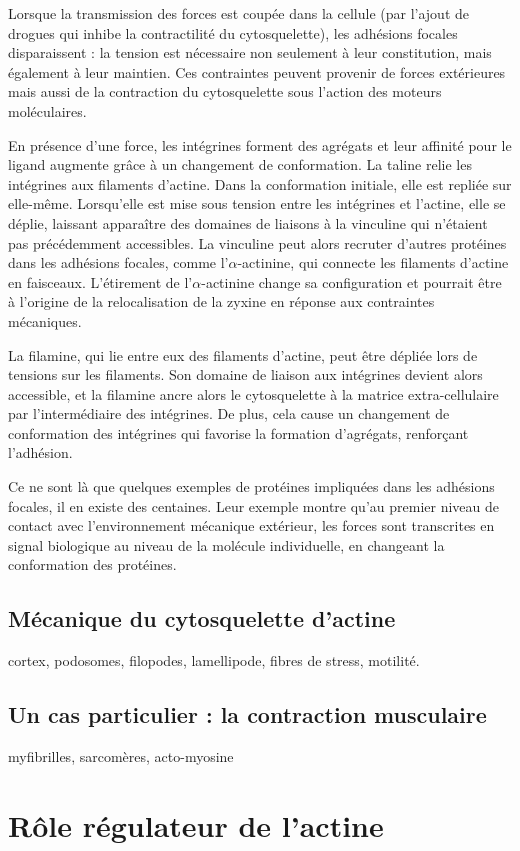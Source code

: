 \documentclass{report}
\begin{document}
Lorsque la transmission des forces est coupée dans la cellule (par l'ajout de drogues qui inhibe la contractilité du cytosquelette), les adhésions focales disparaissent : la tension est nécessaire non seulement à leur constitution, mais également à leur maintien. Ces contraintes peuvent provenir de forces extérieures mais aussi de la contraction du cytosquelette sous l'action des moteurs moléculaires. 

En présence d'une force, les intégrines forment des agrégats et leur affinité pour le ligand augmente grâce à un changement de conformation. 
La taline relie les intégrines aux filaments d'actine. Dans la conformation initiale, elle est repliée sur elle-même. Lorsqu'elle est mise sous tension entre les intégrines et l'actine, elle se déplie, laissant apparaître des domaines de liaisons à la vinculine qui n'étaient pas précédemment accessibles. 
La vinculine peut alors recruter d'autres protéines dans les adhésions focales, comme l'$\alpha$-actinine, qui connecte les filaments d'actine en faisceaux. L'étirement de l'$\alpha$-actinine change sa configuration et pourrait être à l'origine de la relocalisation de la zyxine en réponse aux contraintes mécaniques. 

La filamine, qui lie entre eux des filaments d'actine, peut être dépliée lors de tensions sur les filaments. Son domaine de liaison aux intégrines devient alors accessible, et la filamine ancre alors le cytosquelette à la matrice extra-cellulaire par l'intermédiaire des intégrines. De plus, cela cause un changement de conformation des intégrines qui favorise la formation d'agrégats, renforçant l'adhésion. 

Ce ne sont là que quelques exemples de protéines impliquées dans les adhésions focales, il en existe des centaines. Leur exemple montre qu'au premier niveau de contact avec l'environnement mécanique extérieur, les forces sont transcrites en signal biologique au niveau de la molécule individuelle, en changeant la conformation des protéines. 



\subsection{Mécanique du cytosquelette d'actine}
cortex, podosomes, filopodes, lamellipode, fibres de stress, motilité. 
\subsection{Un cas particulier : la contraction musculaire}
myfibrilles, sarcomères, acto-myosine

\section{Rôle régulateur de l'actine}
\end{document}

